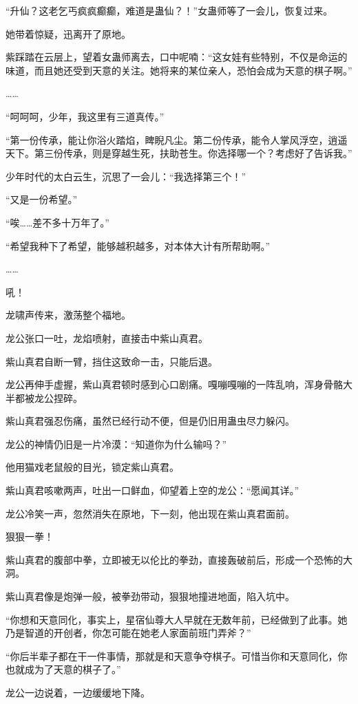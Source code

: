 \begin{this_body}
“升仙？这老乞丐疯疯癫癫，难道是蛊仙？！”女蛊师等了一会儿，恢复过来。

她带着惊疑，迅离开了原地。

紫踩踏在云层上，望着女蛊师离去，口中呢喃：“这女娃有些特别，不仅是命运的味道，而且她还受到天意的关注。她将来的某位亲人，恐怕会成为天意的棋子啊。”

……

“呵呵呵，少年，我这里有三道真传。”

“第一份传承，能让你浴火踏焰，睥睨凡尘。第二份传承，能令人掌风浮空，逍遥天下。第三份传承，则是穿越生死，扶助苍生。你选择哪一个？考虑好了告诉我。”

少年时代的太白云生，沉思了一会儿：“我选择第三个！”

“又是一份希望。”

“唉……差不多十万年了。”

“希望我种下了希望，能够越积越多，对本体大计有所帮助啊。”

……

吼！

龙啸声传来，激荡整个福地。

龙公张口一吐，龙焰喷射，直接击中紫山真君。

紫山真君自断一臂，挡住这致命一击，只能后退。

龙公再伸手虚握，紫山真君顿时感到心口剧痛。嘎嘣嘎嘣的一阵乱响，浑身骨骼大半都被龙公捏碎。

紫山真君强忍伤痛，虽然已经行动不便，但是仍旧用蛊虫尽力躲闪。

龙公的神情仍旧是一片冷漠：“知道你为什么输吗？”

他用猫戏老鼠般的目光，锁定紫山真君。

紫山真君咳嗽两声，吐出一口鲜血，仰望着上空的龙公：“愿闻其详。”

龙公冷笑一声，忽然消失在原地，下一刻，他出现在紫山真君面前。

狠狠一拳！

紫山真君的腹部中拳，立即被无以伦比的拳劲，直接轰破前后，形成一个恐怖的大洞。

紫山真君像是炮弹一般，被拳劲带动，狠狠地撞进地面，陷入坑中。

“你想和天意同化，事实上，星宿仙尊大人早就在无数年前，已经做到了此事。她乃是智道的开创者，你怎可能在她老人家面前班门弄斧？”

“你后半辈子都在干一件事情，那就是和天意争夺棋子。可惜当你和天意同化，你也就成为了天意的棋子了。”

龙公一边说着，一边缓缓地下降。


\end{this_body}
